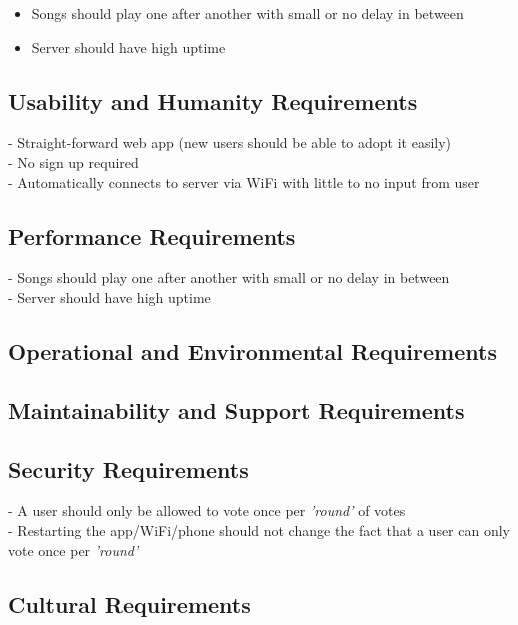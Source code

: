\documentclass[12pt, titlepage]{article}
\begin{document}
\begin{itemize}
\item Songs should play one after another with small or no delay in between
\item Server should have high uptime
\end{itemize}

\subsection{Usability and Humanity Requirements}

- Straight-forward web app (new users should be able to adopt it easily) \\
- No sign up required \\
- Automatically connects to server via WiFi with little to no input from user \\

\subsection{Performance Requirements}

- Songs should play one after another with small or no delay in between \\
- Server should have high uptime \\

\subsection{Operational and Environmental Requirements}

\subsection{Maintainability and Support Requirements}

\subsection{Security Requirements}

- A user should only be allowed to vote once per \textit{'round'} of votes \\
- Restarting the app/WiFi/phone should not change the fact that a user can only
  vote once per \textit{'round'} \\

\subsection{Cultural Requirements}
\end{document}
